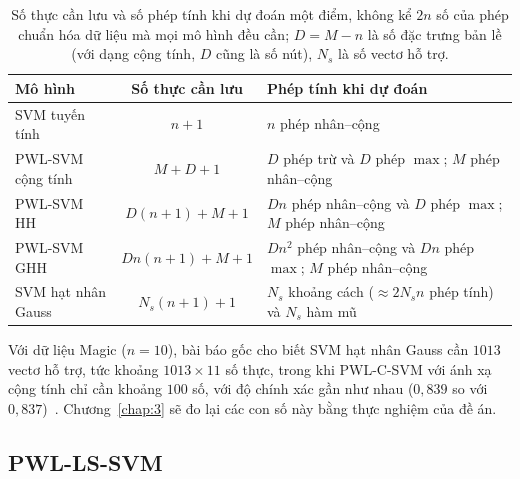 \begin{table}[t]
\centering
\caption[Chi phí lưu trữ và chi phí dự đoán của các mô hình]{Số thực cần lưu và số phép tính khi dự đoán một điểm, không kể $2n$ số của phép chuẩn hóa dữ liệu mà mọi mô hình đều cần; $D=M-n$ là số đặc trưng bản lề (với dạng cộng tính, $D$ cũng là số nút), $N_s$ là số vectơ hỗ trợ.}
\label{tab:cost}
\small
\renewcommand{\arraystretch}{1.25}
\begin{tabularx}{\linewidth}{@{}l c X@{}}
\toprule
\textbf{Mô hình} & \textbf{Số thực cần lưu} & \textbf{Phép tính khi dự đoán}\\
\midrule
SVM tuyến tính & $n+1$ & $n$ phép nhân--cộng\\
PWL-SVM cộng tính & $M+D+1$ & $D$ phép trừ và $D$ phép $\max$; $M$ phép nhân--cộng\\
PWL-SVM HH & $D(n+1)+M+1$ & $Dn$ phép nhân--cộng và $D$ phép $\max$; $M$ phép nhân--cộng\\
PWL-SVM GHH & $Dn(n+1)+M+1$ & $Dn^2$ phép nhân--cộng và $Dn$ phép $\max$; $M$ phép nhân--cộng\\
SVM hạt nhân Gauss & $N_s(n+1)+1$ & $N_s$ khoảng cách ($\approx 2N_sn$ phép tính) và $N_s$ hàm mũ\\
\bottomrule
\end{tabularx}
\end{table}

Với dữ liệu Magic ($n=10$), bài báo gốc cho biết SVM hạt nhân Gauss cần $1013$ vectơ hỗ trợ, tức khoảng $1013\times11$ số thực, trong khi PWL-C-SVM với ánh xạ cộng tính chỉ cần khoảng $100$ số, với độ chính xác gần như nhau ($0{,}839$ so với $0{,}837$)~\cite{huang2013}. Chương~\ref{chap:3} sẽ đo lại các con số này bằng thực nghiệm của đề án.

\subsection{PWL-LS-SVM}

